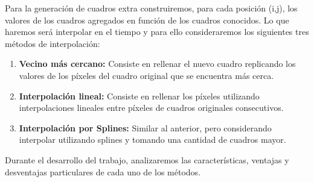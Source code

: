 Para la generaci\'on de cuadros extra construiremos, para cada posici\'on (i,j), los valores de los cuadros agregados en funci\'on de los cuadros conocidos. Lo que haremos ser\'a interpolar en el tiempo y para ello consideraremos los siguientes tres m\'etodos de interpolaci\'on:

\begin{enumerate}
\item \textbf{Vecino m\'as cercano:} Consiste en rellenar el nuevo cuadro replicando los valores de los p\'ixeles del cuadro original que se encuentra m\'as cerca.
\item \textbf{Interpolaci\'on lineal:} Consiste en rellenar los p\'ixeles utilizando interpolaciones lineales entre p\'ixeles de cuadros originales consecutivos.
\item \textbf{Interpolaci\'on por Splines:} Similar al anterior, pero considerando interpolar utilizando splines y tomando una cantidad de cuadros mayor.
\end{enumerate}

Durante el desarrollo del trabajo, analizaremos las caracter\'isticas, ventajas y desventajas particulares de cada uno de los m\'etodos. 
